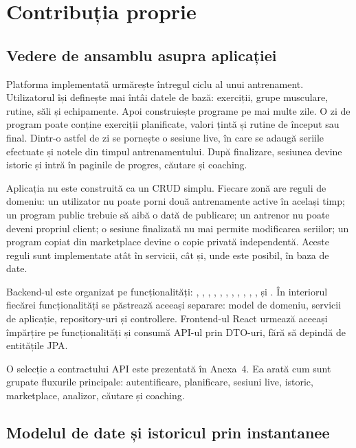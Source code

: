 \chapter{Contribuția proprie}
\label{cap:contributie}

\section{Vedere de ansamblu asupra aplicației}

Platforma implementată urmărește întregul ciclu al unui antrenament. Utilizatorul își definește mai
întâi datele de bază: exerciții, grupe musculare, rutine, săli și echipamente. Apoi construiește
programe pe mai multe zile. O zi de program poate conține exerciții planificate, valori țintă și
rutine de început sau final. Dintr-o astfel de zi se pornește o sesiune live, în care se adaugă
seriile efectuate și notele din timpul antrenamentului. După finalizare, sesiunea devine istoric și
intră în paginile de progres, căutare și coaching.

Aplicația nu este construită ca un CRUD simplu. Fiecare zonă are reguli de domeniu: un utilizator nu
poate porni două antrenamente active în același timp; un program public trebuie să aibă o dată de
publicare; un antrenor nu poate deveni propriul client; o sesiune finalizată nu mai permite modificarea
seriilor; un program copiat din marketplace devine o copie privată independentă. Aceste reguli sunt
implementate atât în servicii, cât și, unde este posibil, în baza de date.

Backend-ul este organizat pe funcționalități: , , ,
, , , , , ,
, ,  și . În interiorul fiecărei
funcționalități se păstrează aceeași separare: model de domeniu, servicii de aplicație,
repository-uri și controllere. Frontend-ul React urmează aceeași împărțire pe funcționalități și
consumă API-ul prin DTO-uri, fără să depindă de entitățile JPA.

O selecție a contractului API este prezentată în Anexa~4. Ea arată cum sunt grupate fluxurile
principale: autentificare, planificare, sesiuni live, istoric, marketplace, analizor, căutare și
coaching.

\section{Modelul de date și istoricul prin instantanee}
\label{sec:instantanee}

